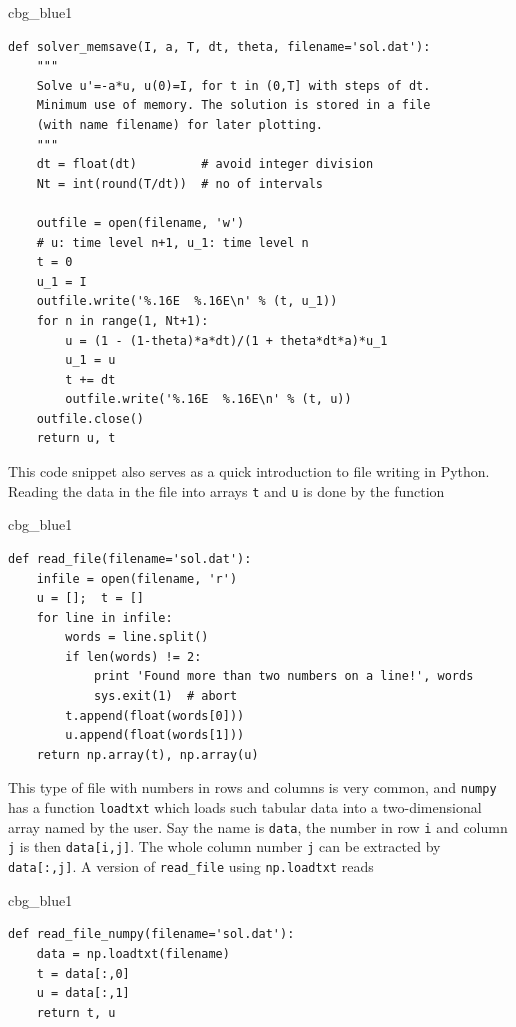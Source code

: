 \documentclass[%
oneside,                 %
final,                   %
10pt]{article}
\newenvironment{_cod_tight}[1]{
   \def\FrameCommand{\colorbox{#1}}
   \FrameRule0.6pt\MakeFramed {\FrameRestore}\vskip3mm}
   {\vskip0mm\endMakeFramed}
\newenvironment{cod}[1]{
\bgroup\rmfamily
\fboxsep=0mm\relax
\begin{_cod_tight}{#1}
\list{}{\parsep=-2mm\parskip=0mm\topsep=0pt\leftmargin=2mm
\rightmargin=2\leftmargin\leftmargin=4pt\relax}
\item\relax}
{\endlist\end{_cod_tight}\egroup}
\begin{document}
\begin{cod}{cbg_blue1}\begin{Verbatim}[numbers=none,fontsize=\fontsize{9pt}{9pt},baselinestretch=0.95,xleftmargin=2mm]
def solver_memsave(I, a, T, dt, theta, filename='sol.dat'):
    """
    Solve u'=-a*u, u(0)=I, for t in (0,T] with steps of dt.
    Minimum use of memory. The solution is stored in a file
    (with name filename) for later plotting.
    """
    dt = float(dt)         # avoid integer division
    Nt = int(round(T/dt))  # no of intervals

    outfile = open(filename, 'w')
    # u: time level n+1, u_1: time level n
    t = 0
    u_1 = I
    outfile.write('%.16E  %.16E\n' % (t, u_1))
    for n in range(1, Nt+1):
        u = (1 - (1-theta)*a*dt)/(1 + theta*dt*a)*u_1
        u_1 = u
        t += dt
        outfile.write('%.16E  %.16E\n' % (t, u))
    outfile.close()
    return u, t
\end{Verbatim}
\end{cod}
\noindent
This code snippet also serves as a quick introduction to file writing in Python.
Reading the data in the file into arrays \texttt{t} and \texttt{u} is done by the
function

\begin{cod}{cbg_blue1}\begin{Verbatim}[numbers=none,fontsize=\fontsize{9pt}{9pt},baselinestretch=0.95,xleftmargin=2mm]
def read_file(filename='sol.dat'):
    infile = open(filename, 'r')
    u = [];  t = []
    for line in infile:
        words = line.split()
        if len(words) != 2:
            print 'Found more than two numbers on a line!', words
            sys.exit(1)  # abort
        t.append(float(words[0]))
        u.append(float(words[1]))
    return np.array(t), np.array(u)
\end{Verbatim}
\end{cod}
\noindent

This type of file with numbers in rows and columns is very common, and
\texttt{numpy} has a function \texttt{loadtxt} which loads such tabular data into a
two-dimensional array named by the user. Say the name is \texttt{data}, the
number in row \texttt{i} and column \texttt{j} is then \texttt{data[i,j]}.  The whole
column number \texttt{j} can be extracted by \texttt{data[:,j]}.  A version of
\Verb!read_file! using \texttt{np.loadtxt} reads

\begin{cod}{cbg_blue1}\begin{Verbatim}[numbers=none,fontsize=\fontsize{9pt}{9pt},baselinestretch=0.95,xleftmargin=2mm]
def read_file_numpy(filename='sol.dat'):
    data = np.loadtxt(filename)
    t = data[:,0]
    u = data[:,1]
    return t, u
\end{Verbatim}
\end{cod}
\noindent
\end{document}
